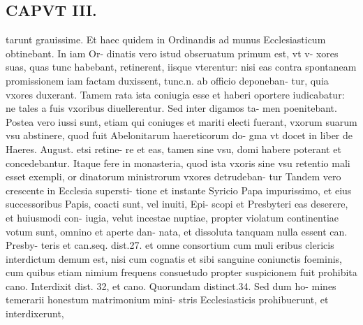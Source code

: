 \documentclass{article}
\begin{document}
\begin{pages}
\section*{CAPVT  III. }
\marginpar{[ p.117 ]}\pstart tarunt grauissime. Et haec quidem in Ordinandis ad munus Ecclesiasticum obtinebant. In iam Or- dinatis vero istud obseruatum primum est, vt v- xores suas, quas tunc habebant, retinerent, iisque vterentur: nisi eas contra spontaneam promissionem iam factam duxissent, tunc.n. ab officio deponeban- tur, quia vxores duxerant. Tamem rata ista coniugia esse et haberi oportere iudicabatur: ne tales a fuis vxoribus diuellerentur. Sed inter digamos ta- men poenitebant. Postea vero iussi sunt, etiam qui coniuges et mariti electi fuerant, vxorum suarum vsu abstinere, quod fuit Abelonitarum haereticorum do- gma vt docet in liber  de Haeres. August. etsi retine- re et eas, tamen sine vsu, domi habere poterant et concedebantur. Itaque fere in monasteria, quod ista vxoris sine vsu retentio mali esset exempli, or dinatorum ministrorum vxores detrudeban- tur Tandem vero crescente in Ecclesia supersti- tione et instante Syricio Papa impurissimo, et eius successoribus Papis, coacti sunt, vel inuiti, Epi- scopi et Presbyteri eas deserere, et huiusmodi con- iugia, velut incestae nuptiae, propter violatum continentiae votum sunt, omnino et aperte dan- nata, et dissoluta tanquam nulla essent can. Presby- teris et can.seq. dist.27. et omne consortium cum muli eribus clericis interdictum demum est, nisi cum cognatis et sibi sanguine coniunctis foeminis, cum quibus etiam nimium frequens consuetudo propter suspicionem fuit prohibita cano. Interdixit dist. 32, et cano. Quorundam distinct.34. Sed dum ho- mines temerarii honestum matrimonium mini- stris Ecclesiasticis prohibuerunt, et interdixerunt,  \pend

\end{pages}
\end{document}
